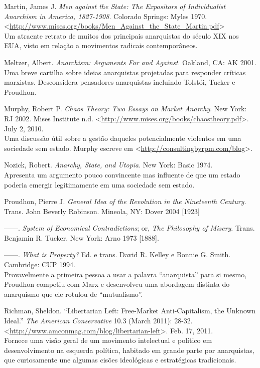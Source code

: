 \begin{hangparas}{0.25in}{1}
Martin, James J. \emph{Men against the State: The Expositors of Individualist Anarchism in America, 1827-1908}. Colorado Springs: Myles 1970. <\url{http://www.mises.org/books/Men_Against_the_State_Martin.pdf}>\smallskip\\
Um atraente retrato de muitos dos principais anarquistas do século XIX nos EUA, visto em relação a movimentos radicais contemporâneos.

Meltzer, Albert. \emph{Anarchism: Arguments For and Against}. Oakland, CA: AK 2001.\smallskip\\
Uma breve cartilha sobre ideias anarquistas projetadas para responder críticas marxistas. Desconsidera pensadores anarquistas incluindo Tolstói, Tucker e Proudhon.

Murphy, Robert P. \emph{Chaos Theory: Two Essays on Market Anarchy}. New York: RJ 2002. Mises Institute n.d. <\url{http://www.mises.org/books/chaostheory.pdf}>. July 2, 2010.\smallskip\\
Uma discussão útil sobre a gestão daqueles potencialmente violentos em uma sociedade sem estado. Murphy escreve em <\url{http://consultingbyrpm.com/blog}>.

Nozick, Robert. \emph{Anarchy, State, and Utopia}. New York: Basic 1974.\smallskip\\
Apresenta um argumento pouco convincente mas influente de que um estado poderia emergir legitimamente em uma sociedade sem estado.

Proudhon, Pierre J. \emph{General Idea of the Revolution in the Nineteenth Century}. Trans. John Beverly Robinson. Mineola, NY: Dover 2004 [1923]

------. \emph{System of Economical Contradictions}; or, \emph{The Philosophy of Misery}. Trans. Benjamin R. Tucker. New York: Arno 1973 [1888].

------. \emph{What is Property?} Ed. e trans. David R. Kelley e Bonnie G. Smith. Cambridge: CUP 1994.\smallskip\\
Provavelmente a primeira pessoa a usar a palavra ``anarquista'' para si mesmo, Proudhon competiu com Marx e desenvolveu uma abordagem distinta do anarquismo que ele rotulou de ``mutualismo''.

Richman, Sheldon. ``Libertarian Left: Free-Market Anti-Capitalism, the Unknown Ideal.'' \emph{The American Conservative} 10.3 (March 2011): 28-32. <\url{http://www.amconmag.com/blog/libertarian-left}>. Feb. 17, 2011.\smallskip\\
Fornece uma visão geral de um movimento intelectual e político em desenvolvimento na esquerda política, habitado em grande parte por anarquistas, que curiosamente une algumas cisões ideológicas e estratégicas tradicionais.


\end{hangparas}
